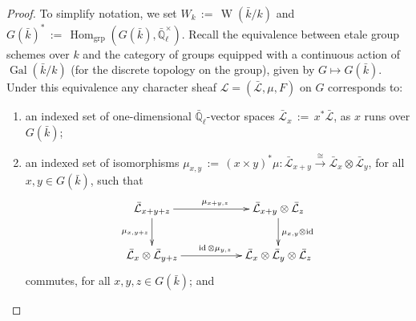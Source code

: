 \documentclass[11pt]{amsart}
\makeatletter
\theoremstyle{plain}
\theoremstyle{definition}
\theoremstyle{remark}
\newcommand{\EE}{\mathbb{\bar Q}_\ell}
\newcommand{\bFq}{\bar{k}}
\newcommand{\Fq}{k}
\DeclareMathOperator{\Gal}{Gal}
\DeclareMathOperator{\Weil}{W}
\DeclareMathOperator{\Hom}{Hom}
\DeclareMathOperator{\id}{id}
\newcommand{\ceq}{{\, :=\, }}
\newcommand{\iso}{{\ \cong\ }}
\newcommand{\cs}[1]{{\mathcal{#1}}}
\newcommand{\gcs}[1]{{\mathcal{\bar #1}}}
\newcommand{\labitem}[2]{%
\def\@itemlabel{\textbf{#1}}
\item
\def\@currentlabel{#1}\label{#2}}
\makeatother
\begin{document}
\begin{proof}
  To simplify notation, we set $W_\Fq \ceq \Weil(\bFq/\Fq)$ and
  $G(\bFq)^* \ceq \Hom_\text{grp}(G(\bFq),\EE^\times)$.  Recall the
  equivalence between etale group schemes over $\Fq$ and the category
  of groups equipped with a continuous action of $\Gal(\bFq/\Fq)$ (for
  the discrete topology on the group), given by $G \mapsto G(\bFq)$.
  Under this equivalence any character sheaf $\cs{L}=(\gcs{L},\mu,F)$
  on $G$ corresponds to:
  \begin{enumerate}
  \labitem{(cs.0)}{cs.0} an indexed set of one-dimensional
    $\EE$-vector spaces $\gcs{L}_x \ceq x^*\gcs{L}$, as $x$ runs over
    $G(\bFq)$;

  \labitem{(cs.1)}{cs.1} an indexed set of isomorphisms
    $\mu_{x,y} \ceq (x \times y)^*\mu : \gcs{L}_{x+y} \mathop{\longrightarrow}\limits^{\iso} \gcs{L}_{x} \otimes \gcs{L}_{y}$,
    for all $x,y \in G(\bFq)$, such that
    \[
    \xymatrix{
      \gcs{L}_{x+y+z} \ar[rr]^{\mu_{x+y,z}} \ar[d]_{\mu_{x,y+z}}
      && \gcs{L}_{x+y}\otimes \gcs{L}_{z} \ar[d]^{\mu_{x,y} \otimes \id} \\
      \gcs{L}_{x} \otimes \gcs{L}_{y+z} \ar[rr]^{\id \otimes \mu_{y,z}}
      && \gcs{L}_{x} \otimes\gcs{L}_{y} \otimes \gcs{L}_{z}\\
      }
    \]
    commutes, for all $x,y,z\in G(\bFq)$; and


\end{enumerate}
\end{proof}
\end{document}
